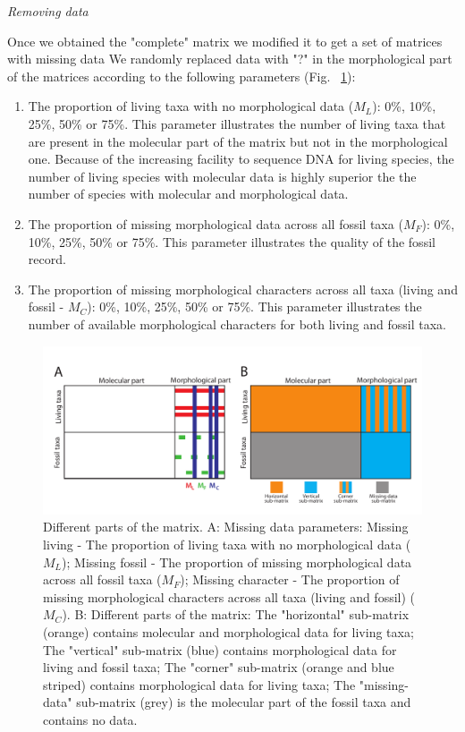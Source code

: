 \documentclass[12pt,letterpaper]{article}
\renewcommand{\subsection}[1]{%
\bigskip
\begin{center}
\begin{large}
\normalfont\itshape #1
\end{large}
\end{center}}
\begin{document}
\subsection{Removing data}
Once we obtained the "complete" matrix we modified it to get a set of matrices with missing data
We randomly replaced data with "?" in the morphological part of the matrices according to the following parameters (Fig. ~\ref{Fig_RemoveData}):

\begin{enumerate}
\item{The proportion of living taxa with no morphological data ($M_{L}$): 0\%, 10\%, 25\%, 50\% or 75\%.}
This parameter illustrates the number of living taxa that are present in the molecular part of the matrix but not in the morphological one.
Because of the increasing facility to sequence DNA for living species, the number of living species with molecular data is highly superior the the number of species with molecular and morphological data.
\item{The proportion of missing morphological data across all fossil taxa ($M_{F}$): 0\%, 10\%, 25\%, 50\% or 75\%.}
This parameter illustrates the quality of the fossil record. 
\item{The proportion of missing morphological characters across all taxa (living and fossil - $M_{C}$): 0\%, 10\%, 25\%, 50\% or 75\%. }
This parameter illustrates the number of available morphological characters for both living and fossil taxa.
\end{enumerate}

\begin{figure}
\centering
\includegraphics[keepaspectratio=true]{Figures/TEM_Fig_missingData.pdf}
\caption{Different parts of the matrix. %
A: Missing data parameters:
Missing living - The proportion of living taxa with no morphological data ($M_{L}$);
Missing fossil - The proportion of missing morphological data across all fossil taxa ($M_{F}$);
Missing character - The proportion of missing morphological characters across all taxa (living and fossil) ($M_{C}$).
B: Different parts of the matrix:
The "horizontal" sub-matrix (orange) contains molecular and morphological data for living taxa;
The "vertical" sub-matrix (blue) contains morphological data for living and fossil taxa;
The "corner" sub-matrix (orange and blue striped) contains morphological data for living taxa;
The "missing-data" sub-matrix (grey) is the molecular part of the fossil taxa and contains no data.}
\label{Fig_RemoveData}
\end{figure}
\end{document}
